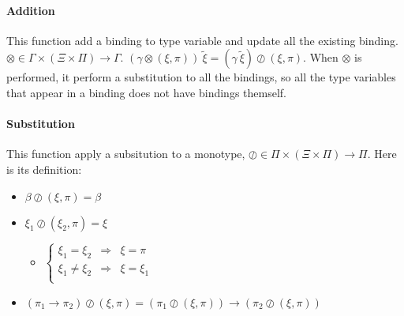 
\paragraph{Addition} This function add a binding to type variable and update all the existing binding. $\otimes\in \Gamma\times(\Xi\times\Pi)\to\Gamma$. $(\gamma\otimes(\xi,\pi))\ \tilde\xi=(\gamma\ \tilde\xi)\oslash(\xi,\pi)$. When $\otimes$ is performed, it perform a substitution to all the bindings, so all the type variables that appear in a binding does not have bindings themself.

\paragraph{Substitution} This function apply a subsitution to a monotype, $\oslash\in\Pi\times(\Xi\times\Pi)\to\Pi$. Here is its definition:
\begin{itemize}
\item $\beta\oslash(\xi,\pi)=\beta$
\item $\xi_1\oslash(\xi_2,\pi)=\xi$
	\begin{itemize}
	\item $\left\{\begin{array}{ccl}
		\xi_1=\xi_2&\Rightarrow&\xi=\pi\\
		\xi_1\neq\xi_2&\Rightarrow&\xi=\xi_1\\
		\end{array}\right.$
	\end{itemize}
\item $(\pi_1\to\pi_2)\oslash(\xi,\pi)=(\pi_1\oslash(\xi,\pi))\to(\pi_2\oslash(\xi,\pi))$
\end{itemize}

